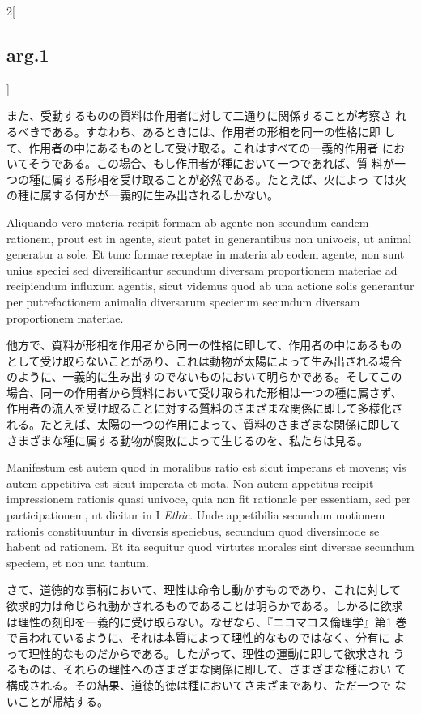 \documentclass[paper=a4paper,fontsize=10pt,jafontsize=9pt,titlepage]{jlreq}
\begin{document}
\begin{paracol}{2}[\subsection{arg.1}]
\switchcolumn

また、受動するものの質料は作用者に対して二通りに関係することが考察さ
 れるべきである。すなわち、あるときには、作用者の形相を同一の性格に即
 して、作用者の中にあるものとして受け取る。これはすべての一義的作用者
 においてそうである。この場合、もし作用者が種において一つであれば、質
 料が一つの種に属する形相を受け取ることが必然である。たとえば、火によっ
 ては火の種に属する何かが一義的に生み出されるしかない。

\switchcolumn*

Aliquando vero materia recipit formam ab agente non secundum eandem
 rationem, prout est in agente, sicut patet in generantibus non
 univocis, ut animal generatur a sole. Et tunc formae receptae in
 materia ab eodem agente, non sunt unius speciei sed diversificantur
 secundum diversam proportionem materiae ad recipiendum influxum
 agentis, sicut videmus quod ab una actione solis generantur per
 putrefactionem animalia diversarum specierum secundum diversam
 proportionem materiae.

\switchcolumn

他方で、質料が形相を作用者から同一の性格に即して、作用者の中にあるもの
として受け取らないことがあり、これは動物が太陽によって生み出される場合
のように、一義的に生み出すのでないものにおいて明らかである。そしてこの
場合、同一の作用者から質料において受け取られた形相は一つの種に属さず、
作用者の流入を受け取ることに対する質料のさまざまな関係に即して多様化さ
れる。たとえば、太陽の一つの作用によって、質料のさまざまな関係に即して
さまざまな種に属する動物が腐敗によって生じるのを、私たちは見る。

\switchcolumn*

Manifestum est autem quod in moralibus ratio est sicut imperans et
 movens; vis autem appetitiva est sicut imperata et mota. Non autem
 appetitus recipit impressionem rationis quasi univoce, quia non fit
 rationale per essentiam, sed per participationem, ut dicitur in I
 {\itshape Ethic}. Unde appetibilia secundum motionem rationis
 constituuntur in diversis speciebus, secundum quod diversimode se
 habent ad rationem. Et ita sequitur quod virtutes morales sint
 diversae secundum speciem, et non una tantum.

\switchcolumn

さて、道徳的な事柄において、理性は命令し動かすものであり、これに対して
欲求的力は命じられ動かされるものであることは明らかである。しかるに欲求
は理性の刻印を一義的に受け取らない。なぜなら、『ニコマコス倫理学』第1
巻で言われているように、それは本質によって理性的なものではなく、分有に
よって理性的なものだからである。したがって、理性の運動に即して欲求され
うるものは、それらの理性へのさまざまな関係に即して、さまざまな種におい
て構成される。その結果、道徳的徳は種においてさまざまであり、ただ一つで
ないことが帰結する。


\end{paracol}
\end{document}
